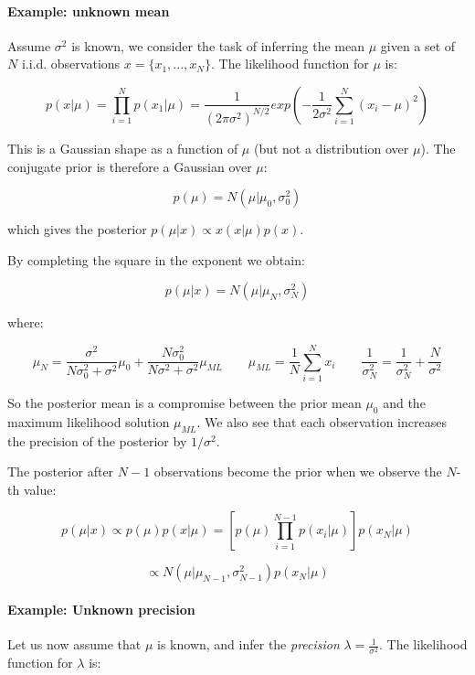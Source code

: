 \documentclass{article}
\begin{document}
\paragraph{Example: unknown mean}\label{example-unknown-mean}

Assume \(\sigma^2\) is known, we consider the task of inferring the mean
\(\mu\) given a set of \(N\) i.i.d. observations
\(x = \{ x_1, ..., x_N \}\). The likelihood function for \(\mu\) is:

\[p(x|\mu ) = \prod_{i=1}^N p(x_1 | \mu ) = \frac{1}{(2\pi \sigma^2)^{N/2}}
exp(-\frac{1}{2\sigma^2} \sum_{i=1}^N (x_i - \mu )^2)\]

This is a Gaussian shape as a function of \(\mu\) (but not a
distribution over \(\mu\)). The conjugate prior is therefore a Gaussian
over \(\mu\):

\[p(\mu ) = N(\mu | \mu_0, \sigma_0^2)\]

which gives the posterior \(p(\mu | x ) \propto x(x | \mu ) p(x)\).

By completing the square in the exponent we obtain:

\[p(\mu | x) = N(\mu | \mu_N, \sigma^2_N)\]

where:

\[\mu_N = \frac{\sigma^2}{N \sigma^2_0 + \sigma^2} \mu_0 + \frac{N \sigma_0^2}{N\sigma^2 + \sigma^2} \mu_{ML} \qquad \mu_{ML} = \frac{1}{N}\sum_{i=1}^{N}x_i \qquad \frac{1}{\sigma_N^2} = \frac{1}{\sigma_N^2} + \frac{N}{\sigma^2}\]

So the posterior mean is a compromise between the prior mean \(\mu_0\)
and the maximum likelihood solution \(\mu_{ML}\). We also see that each
observation increases the precision of the posterior by \(1/\sigma^2\).

The posterior after \(N-1\) observations become the prior when we
observe the \(N\)-th value:

\[p(\mu | x) \propto p(\mu)p(x | \mu ) = [p(\mu)\prod_{i=1}^{N-1}p(x_i | \mu)]
p(x_N | \mu)\]

\[\propto N(\mu | \mu_{N-1}, \sigma_{N-1}^2)p(x_N|\mu )\]

\paragraph{Example: Unknown precision}\label{example-unknown-precision}

Let us now assume that \(\mu\) is known, and infer the \emph{precision}
\(\lambda =
\frac{1}{\sigma^2}\). The likelihood function for \(\lambda\) is:
\end{document}
